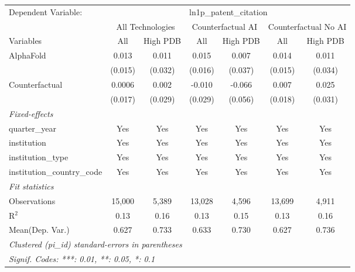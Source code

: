 \begingroup
\centering
\begin{tabular}{lcccccc}
   \tabularnewline \midrule \midrule
   Dependent Variable: & \multicolumn{6}{c}{ln1p\_patent\_citation}\\
 & \multicolumn{2}{c}{All Technologies} & \multicolumn{2}{c}{Counterfactual AI} & \multicolumn{2}{c}{Counterfactual No AI} \\
\cmidrule(lr){1-1}\cmidrule(lr){2-3} \cmidrule(lr){4-5} \cmidrule(lr){6-7}
Variables & \multicolumn{1}{c}{All} & \multicolumn{1}{c}{High PDB} & \multicolumn{1}{c}{All} & \multicolumn{1}{c}{High PDB} & \multicolumn{1}{c}{All} & \multicolumn{1}{c}{High PDB} \\
\cmidrule(lr){1-1}\cmidrule(lr){2-2} \cmidrule(lr){3-3} \cmidrule(lr){4-4} \cmidrule(lr){5-5} \cmidrule(lr){6-6} \cmidrule(lr){7-7}
   AlphaFold                    & 0.013   & 0.011   & 0.015   & 0.007   & 0.014   & 0.011\\   
                                & (0.015) & (0.032) & (0.016) & (0.037) & (0.015) & (0.034)\\   
   Counterfactual               & 0.0006  & 0.002   & -0.010  & -0.066  & 0.007   & 0.025\\   
                                & (0.017) & (0.029) & (0.029) & (0.056) & (0.018) & (0.031)\\   
   \midrule
   \emph{Fixed-effects}\\
   quarter\_year                & Yes     & Yes     & Yes     & Yes     & Yes     & Yes\\  
   institution                  & Yes     & Yes     & Yes     & Yes     & Yes     & Yes\\  
   institution\_type            & Yes     & Yes     & Yes     & Yes     & Yes     & Yes\\  
   institution\_country\_code   & Yes     & Yes     & Yes     & Yes     & Yes     & Yes\\  
   \midrule
   \emph{Fit statistics}\\
   Observations                 & 15,000  & 5,389   & 13,028  & 4,596   & 13,699  & 4,911\\  
   R$^2$                        & 0.13    & 0.16    & 0.13    & 0.15    & 0.13    & 0.16\\  
Mean(Dep. Var.) & 0.627 & 0.733 & 0.633 & 0.730 & 0.627 & 0.736 \\
   \midrule \midrule
   \multicolumn{7}{l}{\emph{Clustered (pi\_id) standard-errors in parentheses}}\\
   \multicolumn{7}{l}{\emph{Signif. Codes: ***: 0.01, **: 0.05, *: 0.1}}\\
\end{tabular}
\par\endgroup
